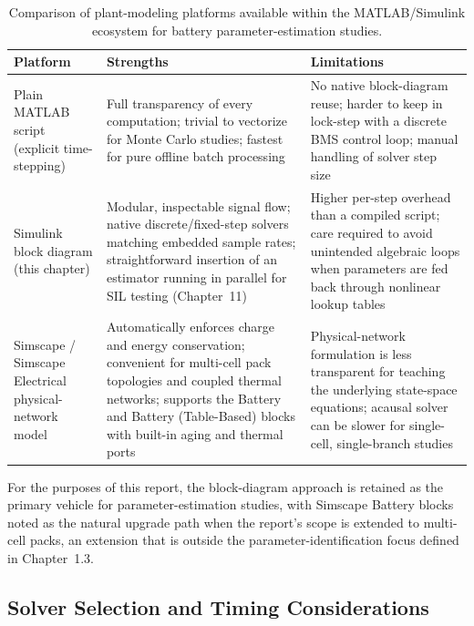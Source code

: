 \begin{table}[htbp]
\centering
\caption{Comparison of plant-modeling platforms available within the MATLAB/Simulink ecosystem for battery parameter-estimation studies.}
\label{tab:10_platforms}
\begin{tabular}{p{2.6cm}p{4.6cm}p{4.6cm}}
\toprule
\textbf{Platform} & \textbf{Strengths} & \textbf{Limitations} \\
\midrule
Plain MATLAB script (explicit time-stepping) &
Full transparency of every computation; trivial to vectorize for
Monte Carlo studies; fastest for pure offline batch processing &
No native block-diagram reuse; harder to keep in lock-step with a
discrete BMS control loop; manual handling of solver step size \\
\addlinespace
Simulink block diagram (this chapter) &
Modular, inspectable signal flow; native discrete/fixed-step solvers
matching embedded sample rates; straightforward insertion of an
estimator running in parallel for SIL testing (Chapter~11) &
Higher per-step overhead than a compiled script; care required to
avoid unintended algebraic loops when parameters are fed back
through nonlinear lookup tables \\
\addlinespace
Simscape / Simscape Electrical physical-network model &
Automatically enforces charge and energy conservation; convenient
for multi-cell pack topologies and coupled thermal networks;
supports the Battery and Battery (Table-Based) blocks with built-in
aging and thermal ports \cite{mathworks_battery_block,mathworks_simscape_battery} &
Physical-network formulation is less transparent for teaching the
underlying state-space equations; acausal solver can be slower for
single-cell, single-branch studies \\
\bottomrule
\end{tabular}
\end{table}

For the purposes of this report, the block-diagram approach is
retained as the primary vehicle for parameter-estimation studies,
with Simscape Battery blocks noted as the natural upgrade path when
the report's scope is extended to multi-cell packs, an extension that
is outside the parameter-identification focus defined in
Chapter~1.3.

\subsection{Solver Selection and Timing Considerations}

